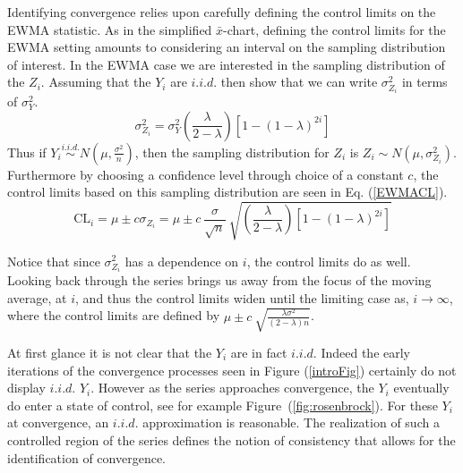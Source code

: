 \documentclass[12pt]{article}
\begin{document}
%
%

%
Identifying convergence relies upon carefully defining the control limits on the EWMA statistic.
%
As in the simplified $\bar x$-chart, defining the control limits for the EWMA setting amounts to considering an interval on the sampling distribution of interest.
In the EWMA case we are interested in the sampling distribution of the $Z_i$.
Assuming that the $Y_i$ are $i.i.d.$ then \cite{ewmaPaper} show that we can write $\sigma^2_{Z_i}$ in terms of $\sigma^2_{Y}$. 
%
\begin{equation}
\sigma^2_{Z_i} = \sigma^2_{Y}\left(\frac{\lambda}{2-\lambda}\right)\left[1-(1-\lambda)^{2i}\right]
\end{equation}
Thus if $Y_i \stackrel{i.i.d.}{\sim} N\left(\mu, \frac{\sigma^2}{n}\right)$, then the sampling distribution for $Z_i$ is $Z_i \sim N\left(\mu, \sigma^2_{Z_i}\right)$.
%
Furthermore by choosing a confidence level through choice of a constant $c$, the control limits based on this sampling distribution are seen in Eq. (\ref{EWMACL}).%
%
%
%
\begin{equation}
\text{CL}_i = \mu \pm c \sigma_{Z_i}
=  \mu \pm c ~ \frac{\sigma}{\sqrt{n}}~\sqrt{\left(\frac{\lambda}{2-\lambda}\right)\left[1-(1-\lambda)^{2i}\right]}
\label{EWMACL}
\end{equation}
%
%

%
Notice that since $\sigma^2_{Z_i}$ has a dependence on $i$, the control limits do as well.
Looking back through the series brings us away from the focus of the moving average, at $i$, and thus the control limits widen until the limiting case as, $i\rightarrow\infty$, where the control limits are defined by $\mu \pm c ~ \sqrt{\frac{\lambda\sigma^2}{(2-\lambda)n}}$.

%
At first glance it is not clear that the $Y_i$ are in fact $i.i.d.$
%
Indeed the early iterations of the convergence processes seen in Figure (\ref{introFig}) certainly do not display $i.i.d.$ $Y_i$. 
%
However as the series approaches convergence, the $Y_i$ eventually do enter a state of control, see for example Figure~(\ref{fig:rosenbrock}).
%
For these $Y_i$ at convergence, an $i.i.d.$ approximation is reasonable.
%
The realization of such a controlled region of the series defines the notion of consistency that allows for the identification of convergence. 
\end{document}
